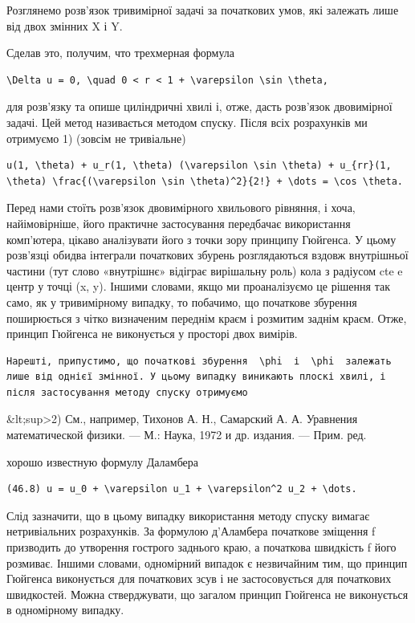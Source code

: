 \documentclass[
  ukrainian,
]{article}
\begin{document}
Розглянемо розв'язок тривимірної задачі за початкових умов, які залежать
лише від двох змінних X і Y.

Сделав это, получим, что трехмерная формула

\begin{verbatim}
\Delta u = 0, \quad 0 < r < 1 + \varepsilon \sin \theta,
\end{verbatim}

для розв'язку та опише циліндричні хвилі і, отже, дасть розв'язок
двовимірної задачі. Цей метод називається методом спуску. Після всіх
розрахунків ми отримуємо 1) (зовсім не тривіальне)

\begin{verbatim}
u(1, \theta) + u_r(1, \theta) (\varepsilon \sin \theta) + u_{rr}(1, \theta) \frac{(\varepsilon \sin \theta)^2}{2!} + \dots = \cos \theta.
\end{verbatim}

Перед нами стоїть розв'язок двовимірного хвильового рівняння, і хоча,
найімовірніше, його практичне застосування передбачає використання
комп'ютера, цікаво аналізувати його з точки зору принципу Гюйгенса. У
цьому розв'язці обидва інтеграли початкових збурень розглядаються вздовж
внутрішньої частини (тут слово «внутрішнє» відіграє вирішальну роль)
кола з радіусом cte e центр у точці (x, y). Іншими словами, якщо ми
проаналізуємо це рішення так само, як у тривимірному випадку, то
побачимо, що початкове збурення поширюється з чітко визначеним переднім
краєм і розмитим заднім краєм. Отже, принцип Гюйгенса не виконується у
просторі двох вимірів.

\begin{verbatim}
Нарешті, припустимо, що початкові збурення  \phi  і  \phi  залежать лише від однієї змінної. У цьому випадку виникають плоскі хвилі, і після застосування методу спуску отримуємо
\end{verbatim}

\&lt;sup\textgreater2) См., например, Тихонов А. Н., Самарский А. А.
Уравнения математической физики. --- М.: Наука, 1972 и др. издания. ---
Прим. ред.

хорошо известную формулу Даламбера

\begin{verbatim}
(46.8) u = u_0 + \varepsilon u_1 + \varepsilon^2 u_2 + \dots.
\end{verbatim}

Слід зазначити, що в цьому випадку використання методу спуску вимагає
нетривіальних розрахунків. За формулою д'Аламбера початкове зміщення f
призводить до утворення гострого заднього краю, а початкова швидкість f
його розмиває. Іншими словами, одномірний випадок є незвичайним тим, що
принцип Гюйгенса виконується для початкових зсув і не застосовується для
початкових швидкостей. Можна стверджувати, що загалом принцип Гюйгенса
не виконується в одномірному випадку.
\end{document}
